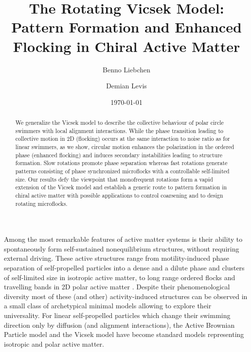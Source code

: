 \documentclass[aps,twocolumn,showlabels,showrefs,amsmath,amssymb,pre,superscriptaddress, floatfix, colors]{revtex4}
\newcommand{\1}{\begin{equation}}
\newcommand{\2}{\end{equation}}
\newcommand{\4}[2]{{\frac{#1}{#2}}}
\begin{document}
\title{The Rotating Vicsek Model: Pattern Formation and Enhanced Flocking in Chiral Active Matter}
\date{\today}


\author{Benno Liebchen}
\author{Demian Levis}

\begin{abstract}
We generalize the Vicsek model to describe the collective behaviour of polar circle swimmers with local alignment interactions. %
While the phase transition leading to collective motion in 2D (flocking) occurs at the same interaction to noise ratio as for linear swimmers, as we show, 
circular motion enhances the polarization in the ordered phase (enhanced flocking) and induces secondary instabilities leading to structure formation. 
Slow rotations promote phase separation whereas fast rotations 
generate patterns consisting of phase synchronized microflocks with a controllable self-limited size. 
Our results defy the viewpoint that monofrequent rotations form a vapid extension of the Vicsek model and establish
a generic route to pattern formation in chiral active matter 
with possible applications to control coarsening and to design rotating microflocks.
\end{abstract}

\maketitle

Among the most remarkable features of active matter systems is their ability to spontaneously form self-sustained nonequilibrium structures, without requiring external driving. 
These active structures range from motility-induced phase separation of self-propelled particles into a dense and a dilute phase \cite{Tailleur2008, Cates2015} and clusters
of self-limited size \cite{Theurkauff2012,Palacci2013,Buttinoni2013,Levis2014,Liebchen2015} in isotropic active matter, %
to long range ordered flocks and travelling bands in 2D polar active matter 
\cite{Vicsek1995,Toner1995, Farrell2012, Caussin2014, Solon2015}.
Despite their phenomenological diversity most of these (and other) activity-induced structures
can be observed in a small class of archetypical minimal models allowing to explore their universality. 
For linear self-propelled particles which change their swimming direction only by diffusion (and alignment interactions), 
the Active Brownian Particle model and 
the Vicsek model have become standard models representing isotropic and polar active matter.
%
\end{document}
